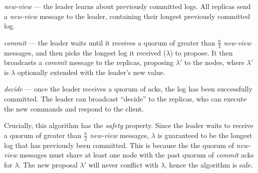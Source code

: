 \begin{description}
	\item \textit{new-view} --- the leader learns about previously committed logs. All replicas send a \textit{new-view} message to the leader, containing their longest previously committed log.
	\item \textit{commit} --- the leader waits until it receives a quorum of greater than $\frac{n}{2}$ \textit{new-view} messages, and then picks the longest log it received ($\lambda$) to propose. It then broadcasts a \textit{commit} message to the replicas, proposing $\lambda'$ to the nodes, where $\lambda'$ is $\lambda$ optionally extended with the leader's new value.
	\item \textit{decide} --- once the leader receives a quorum of acks, the log has been successfully committed. The leader can broadcast ``decide'' to the replicas, who can execute the new commands and respond to the client.
\end{description}

Crucially, this algorithm has the \textit{safety} property. Since the leader waits to receive a quorum of greater than $\frac{n}{2}$ \textit{new-view} messages, $\lambda$ is guaranteed to be the longest log that has previously been committed. This is because the the quorum of \textit{new-view} messages must share at least one node with the past quorum of \textit{commit} acks for $\lambda$. The new proposal $\lambda'$ will never conflict with $\lambda$, hence the algorithm is safe.

